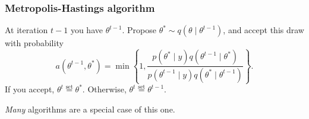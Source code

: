 \documentclass{beamer}
\begin{document}
\begin{frame}
\frametitle{Metropolis-Hastings algorithm}

At iteration $t-1$ you have $\theta^{t-1}$. Propose $\theta^* \sim q(\theta \mid \theta^{t-1})$, and accept this draw with probability 
$$
a(\theta^{t-1}, \theta^*) = \min\left\{1, \frac{p(\theta^* \mid y)q(\theta^{t-1} \mid \theta^*) }{p(\theta^{t-1} \mid y) q(\theta^* \mid \theta^{t-1}) }\right\}.
$$
If you accept, $\theta^t \overset{\text{set}}{=} \theta^*$. Otherwise, $\theta^t \overset{\text{set}}{=} \theta^{t-1}$. 
\newline

{\it Many} algorithms are a special case of this one.

\end{frame}
\end{document}
